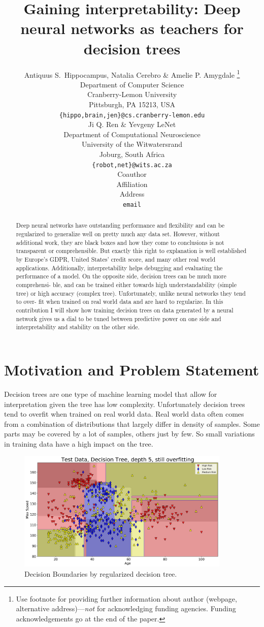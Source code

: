 \documentclass{article} %
\title{Gaining interpretability: Deep neural networks as teachers for decision trees}
\author{Antiquus S.~Hippocampus, Natalia Cerebro \& Amelie P. Amygdale \thanks{ Use footnote for providing further information
about author (webpage, alternative address)---\emph{not} for acknowledging
funding agencies.  Funding acknowledgements go at the end of the paper.} \\
Department of Computer Science\\
Cranberry-Lemon University\\
Pittsburgh, PA 15213, USA \\
\texttt{\{hippo,brain,jen\}@cs.cranberry-lemon.edu} \\
\And
Ji Q. Ren \& Yevgeny LeNet \\
Department of Computational Neuroscience \\
University of the Witwatersrand \\
Joburg, South Africa \\
\texttt{\{robot,net\}@wits.ac.za} \\
\AND
Coauthor \\
Affiliation \\
Address \\
\texttt{email}
}
\begin{document}
\maketitle

\begin{abstract}

Deep neural networks have outstanding performance and flexibility and can be
regularized to generalize well on pretty much any data set. However, without
additional work, they are black boxes and how they come to conclusions is not
transparent or comprehensible. But exactly this right to explanation is well established by Europe’s GDPR, United States’ credit score, and many other real world
applications. Additionally, interpretability helps debugging and evaluating the performance of a model. On the opposite side, decision trees can be much more comprehensi-
ble, and can be trained either towards high understandability (simple tree) or high
accuracy (complex tree). Unfortunately, unlike neural networks they tend to over-
fit when trained on real world data and are hard to regularize. In this contribution I
will show how training decision trees on data generated by a neural network gives
us a dial to be tuned between predictive power on one side and interpretability and
stability on the other side.
\end{abstract}

\section{Motivation and Problem Statement}

Decision trees are one type of machine learning model that allow for interpretation given the tree has low complexity. Unfortunately decision trees tend to overfit when trained on real world data. Real world data often comes from a combination of distributions that largely differ in density of samples. Some parts may be covered by a lot of samples, others just by few. So small variations in training data have a high impact on the tree. 

\begin{figure}[h]
\begin{center}
\includegraphics[width=4.0in]{dt-reg-all.png}
\end{center}
\caption{Decision Boundaries by regularized decision tree.}
\label{fig:dt_reg_bad}
\end{figure}
\end{document}
